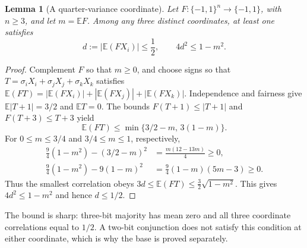 \documentclass[11pt]{article}
\newtheorem{lemma}[theorem]{Lemma}
\theoremstyle{remark}\newtheorem{remark}[theorem]{Remark}
\newcommand{\E}{\mathbb E}\newcommand{\PP}{\mathbb P}\newcommand{\dd}{\,\mathrm d}
\numberwithin{equation}{section}
\begin{document}
\begin{lemma}[A quarter-variance coordinate]\label{lem:normalized-gap}
Let $F:\{-1,1\}^n\to\{-1,1\}$, with $n\ge3$, and let $m=\E F$.
Among any three distinct coordinates, at least one satisfies
\begin{equation}\label{eq:normalized-gap}
 d:=|\E(FX_i)|\le\frac12,\qquad 4d^2\le1-m^2.
\end{equation}
\end{lemma}
\begin{proof}
Complement $F$ so that $m\ge0$, and choose signs so that
$T=\sigma_iX_i+\sigma_jX_j+\sigma_kX_k$ satisfies
$\E(FT)=|\E(FX_i)|+|\E(FX_j)|+|\E(FX_k)|$.
Independence and fairness give $\E|T+1|=3/2$ and $\E T=0$.
The bounds $F(T+1)\le|T+1|$ and $F(T+3)\le T+3$ yield
\[
 \E(FT)\le\min\{3/2-m,\,3(1-m)\}.
\]
For $0\le m\le3/4$ and $3/4\le m\le1$, respectively,
\begin{align*}
 \frac94(1-m^2)-(3/2-m)^2
 &=\frac{m(12-13m)}4\ge0,\\
 \frac94(1-m^2)-9(1-m)^2
 &=\frac94(1-m)(5m-3)\ge0.
\end{align*}
Thus the smallest correlation obeys
$3d\le\E(FT)\le\tfrac32\sqrt{1-m^2}$.
This gives $4d^2\le1-m^2$ and hence $d\le1/2$.
\end{proof}
The bound is sharp: three-bit majority has mean zero and all three
coordinate correlations equal to $1/2$.
A two-bit conjunction does not satisfy this condition at either coordinate,
which is why the base is proved separately.
\end{document}
